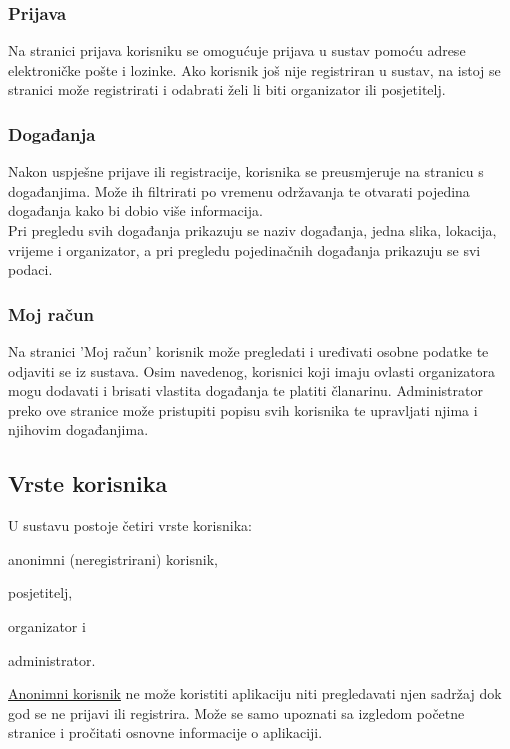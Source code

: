 				\subsubsection{Prijava}
				 Na stranici prijava korisniku se omogućuje prijava u sustav pomoću adrese elektroničke pošte i lozinke. Ako korisnik još nije registriran u sustav, na istoj se stranici može registrirati i odabrati želi li biti organizator ili posjetitelj.
				 
				\subsubsection{Događanja}
				Nakon uspješne prijave ili registracije, korisnika se preusmjeruje na stranicu s događanjima. Može ih filtrirati po vremenu održavanja te otvarati pojedina događanja kako bi dobio više informacija.\\
				Pri pregledu svih događanja prikazuju se naziv događanja, jedna slika, lokacija, vrijeme i organizator, a pri pregledu pojedinačnih događanja prikazuju se svi podaci.
				
				\subsubsection{Moj račun}
				Na stranici 'Moj račun' korisnik može pregledati i uređivati osobne podatke te odjaviti se iz sustava. Osim navedenog, korisnici koji imaju ovlasti organizatora mogu dodavati i brisati vlastita događanja te platiti članarinu. Administrator preko ove stranice može pristupiti popisu svih korisnika te upravljati njima i njihovim događanjima.
				
			
			\subsection{Vrste korisnika}
			U sustavu postoje četiri vrste korisnika:
			\begin{packed_enum}
				\item anonimni (neregistrirani) korisnik,
				\item posjetitelj,
				\item organizator i 
				\item administrator.
			\end{packed_enum}
			
			\underline{Anonimni korisnik} ne može koristiti aplikaciju niti pregledavati njen sadržaj dok god se ne prijavi ili registrira. Može se samo upoznati sa izgledom početne stranice i pročitati osnovne informacije o aplikaciji. \\
			
